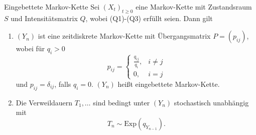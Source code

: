 \begin{karte}{Eingebettete Markov-Kette}
    Sei \((X_t)_{t\geq 0}\) eine Markov-Kette mit Zustandsraum \(S\) und 
    Intensitätsmatrix \(Q\), wobei (Q1)-(Q3) erfüllt seien. Dann gilt 
    \begin{enumerate}
        \item \((Y_n)\) ist eine zeitdiskrete Markov-Kette mit Übergangsmatrix \(P = (p_{ij})\), 
        wobei für \(q_i > 0\) 
        \[ p_{ij} = \begin{cases}
            \frac{q_{ij}}{q_i}, &i\neq j \\
            0, &i=j
        \end{cases} \]
        und \(p_{ij} = \delta_{ij}\), falls \(q_i = 0\). \((Y_n)\) heißt 
        eingebettete Markov-Kette.
        \item Die Verweildauern \(T_1, \ldots \) sind bedingt unter 
        \((Y_n)\) stochastisch unabhängig mit 
        \[ T_n \sim \mathrm{Exp}(q_{Y_{n-1}}). \]
    \end{enumerate}
\end{karte}